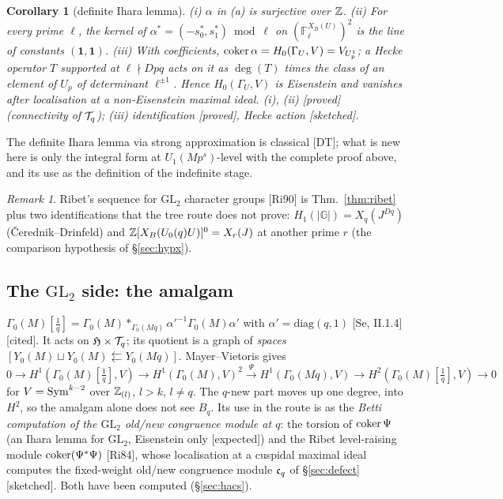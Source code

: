 \documentclass[11pt]{amsart}
\theoremstyle{plain}
\newtheorem{corollary}[theorem]{Corollary}
\theoremstyle{definition}
\theoremstyle{remark}
\newtheorem{remark}[theorem]{Remark}
\newcommand{\status}[1]{\textup{\textsf{[#1]}}}
\newcommand{\stproved}{\status{proved}}
\newcommand{\stcited}{\status{cited}}
\newcommand{\stsketch}{\status{sketched}}
\newcommand{\stexp}{\status{expected}}
\newcommand{\F}{\mathbb{F}}\newcommand{\A}{\mathbb{A}}\newcommand{\cO}{\mathcal{O}}
\newcommand{\GL}{\mathrm{GL}}\newcommand{\SL}{\mathrm{SL}}\newcommand{\PGL}{\mathrm{PGL}}
\newcommand{\G}{\mathbb{G}}\newcommand{\Iw}{\mathrm{Iw}}\newcommand{\Hb}{\mathfrak{H}}
\begin{document}
\begin{corollary}[definite Ihara lemma]\label{cor:ihara}
(i) $\alpha$ in (a) is surjective over $\mathbb{Z}$. (ii) For every prime $\ell$, the kernel of $\alpha^*=(-s_0^*,s_1^*)\bmod\ell$ on $(\F_\ell^{X_B(U)})^2$ is the line of constants $(\mathbf1,\mathbf1)$. (iii) With coefficients, $\operatorname{coker}\alpha=H_0(\Gamma_U,V)=V_{U^1_p}$; a Hecke operator $T$ supported at $\ell\nmid Dpq$ acts on it as $\deg(T)$ times the class of an element of $U_p$ of determinant $\ell^{\pm1}$. Hence $H_0(\Gamma_U,V)$ is Eisenstein and vanishes after localisation at a non-Eisenstein maximal ideal.
(i), (ii) \stproved{} (connectivity of $\mathcal{T}_q$); (iii) identification \stproved, Hecke action \stsketch.
\end{corollary}
The definite Ihara lemma via strong approximation is classical [DT]; what is new here is only the integral form at $U_1(Mp^s)$-level with the complete proof above, and its use as the definition of the indefinite stage.

\begin{remark}
Ribet's sequence for $\GL_2$ character groups [Ri90] is Thm.~\ref{thm:ribet} plus two identifications that the tree route does not prove: $H_1(|\G|)=X_q(J^{Dq})$ (Čerednik--Drinfeld) and $\mathbb{Z}[X_{B}(U_0(q)U)]^0=X_r(J)$ at another prime $r$ (the comparison hypothesis of \S\ref{sec:hypx}).
\end{remark}

\subsection{The $\GL_2$ side: the amalgam}\label{ss:amalgam}
$\Gamma_0(M)[\frac1q]=\Gamma_0(M)*_{\Gamma_0(Mq)}\alpha'^{-1}\Gamma_0(M)\alpha'$ with $\alpha'=\mathrm{diag}(q,1)$ [Se, II.1.4] \stcited. It acts on $\Hb\times\cT_q$; its quotient is a graph of \emph{spaces} $[Y_0(M)\sqcup Y_0(M)\leftleftarrows Y_0(Mq)]$. Mayer--Vietoris gives
\[0\to H^1(\Gamma_0(M)[\tfrac1q],V)\to H^1(\Gamma_0(M),V)^2\xrightarrow{\Psi}H^1(\Gamma_0(Mq),V)\to H^2(\Gamma_0(M)[\tfrac1q],V)\to0\]
for $V=\mathrm{Sym}^{k-2}$ over $\mathbb{Z}_{(l)}$, $l>k$, $l\ne q$. The $q$-new part moves up one degree, into $H^2$, so the amalgam alone does not see $B_q$. Its use in the route is as the \emph{Betti computation of the $\GL_2$ old/new congruence module at $q$}: the torsion of $\operatorname{coker}\Psi$ (an Ihara lemma for $\GL_2$, Eisenstein only \stexp) and the Ribet level-raising module $\operatorname{coker}(\Psi^*\Psi)$ [Ri84], whose localisation at a cuspidal maximal ideal computes the fixed-weight old/new congruence module $\mathfrak{c}_q$ of \S\ref{sec:defect} \stsketch. Both have been computed (\S\ref{sec:hacs}).
\end{document}
